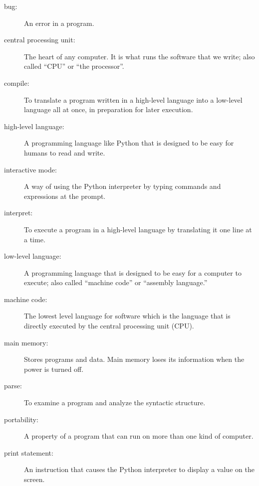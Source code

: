 \begin{description}

\item[bug:]  An error in a program.

\item[central processing unit:] The heart of any computer.  It is what
runs the software that we write; also called ``CPU'' or ``the processor''.

\item[compile:]  To translate a program written in a high-level language
into a low-level language all at once, in preparation for later
execution.

\item[high-level language:]  A programming language like Python that
is designed to be easy for humans to read and write.

\item[interactive mode:] A way of using the Python interpreter by
typing commands and expressions at the prompt.

\item[interpret:]  To execute a program in a high-level language
by translating it one line at a time.

\item[low-level language:]  A programming language that is designed
to be easy for a computer to execute; also called ``machine code'' or
``assembly language.''

\item[machine code:]  The lowest level language for software which 
is the language that is directly executed by the central processing unit 
(CPU).

\item[main memory:] Stores programs and data.  Main memory loses 
its information when the power is turned off.

\item[parse:]  To examine a program and analyze the syntactic structure.

\item[portability:]  A property of a program that can run on more
than one kind of computer.

\item[print statement:]  An instruction that causes the Python
interpreter to display a value on the screen.


\end{description}
